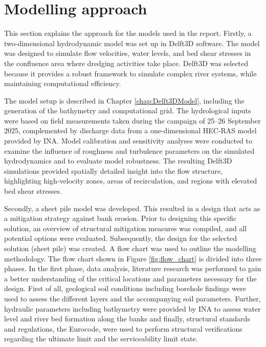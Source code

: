 \section{Modelling approach}
This section explains the approach for the models used in the report. Firstly, a two-dimensional hydrodynamic model was set up in Delft3D software. The model was designed to simulate flow velocities, water levels, and bed shear stresses in the confluence area where dredging activities take place. Delft3D was selected because it provides a robust framework to simulate complex river systems, while maintaining computational efficiency.

The model setup is described in Chapter \ref{chap:Delft3DModel}, including the generation of the bathymetry and computational grid. The hydrological inputs were based on field measurements taken during the campaign of 25–26 September 2025, complemented by discharge data from a one-dimensional HEC-RAS model provided by INA. Model calibration and sensitivity analyses were conducted to examine the influence of roughness and turbulence parameters on the simulated hydrodynamics and to evaluate model robustness. The resulting Delft3D simulations provided spatially detailed insight into the flow structure, highlighting high-velocity zones, areas of recirculation, and regions with elevated bed shear stresses.

Secondly, a sheet pile model was developed. This resulted in a design that acts as a mitigation strategy against bank erosion. Prior to designing this specific solution, an overview of structural mitigation measures was compiled, and all potential options were evaluated. Subsequently, the design for the selected solution (sheet pile) was created. A flow chart was used to outline the modelling methodology. The flow chart shown in Figure \ref{fig:flow_chart} is divided into three phases. In the first phase, data analysis, literature research was performed to gain a better understanding of the critical locations and parameters necessary for the design. First of all, geological soil conditions including borehole findings were used to assess the different layers and the accompanying soil parameters. Further, hydraulic parameters including bathymetry were provided by INA to assess water level and river bed formation along the banks and finally, structural standards and regulations, the Eurocode, were used to perform structural verifications regarding the ultimate limit and the serviceability limit state.

